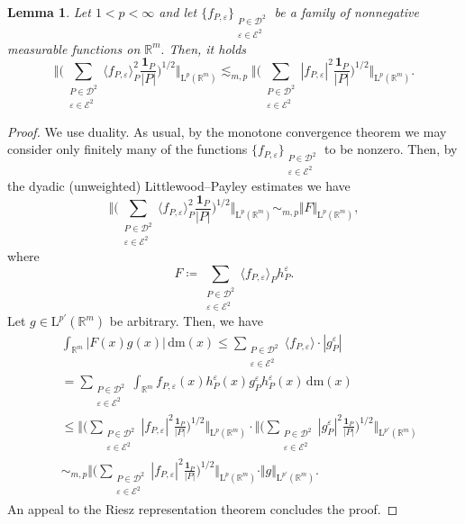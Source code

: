 \documentclass{article}
\newtheorem{lemma}[theorem]{Lemma}
\theoremstyle{definition}
\theoremstyle{remark}
\numberwithin{equation}{section}
\newcommand{\mathdm}{\,\mathrm{dm}}
\newcommand{\cD}{\mathcal{D}}
\newcommand{\cE}{\mathcal{E}}
\newcommand{\e}{\varepsilon}
\newcommand{\reals}{\mathbb{R}}
\newcommand{\Lp}[1]{\mathrm{L}^{#1}}
\newcommand{\1}{\mathbf{1}}
\begin{document}
    \begin{lemma}
        \label{lemma:technical_observation}
        Let $1<p<\infty$ and let $\{f_{P,\e}\}_{\substack{P\in\cD^2\\\e\in\cE^2}}$ be a family of nonnegative measurable functions on $\reals^m.$ Then, it holds
        \begin{equation*}
            \bigg\Vert\bigg(\sum_{\substack{P\in\cD^2\\\e\in\cE^2}}\langle f_{P,\e}\rangle_{P}^2\frac{\1_{P}}{|P|}\bigg)^{1/2}\bigg\Vert_{\Lp{p}(\reals^{m})}
            \lesssim_{m,p}\bigg\Vert\bigg(\sum_{\substack{P\in\cD^2\\\e\in\cE^2}} |f_{P,\e}|^2\frac{\1_{P}}{|P|}\bigg)^{1/2}\bigg\Vert_{\Lp{p}(\reals^{m})}.
        \end{equation*}
    \end{lemma}

    \begin{proof}
        We use duality. As usual, by the monotone convergence theorem we may consider only finitely many of the functions $\{f_{P,\e}\}_{\substack{P\in\cD^2\\\e\in\cE^2}}$ to be nonzero. Then, by the dyadic (unweighted) Littlewood--Payley estimates we have
        \begin{equation*}
            \bigg\Vert\bigg(\sum_{\substack{P\in\cD^2\\\e\in\cE^2}}\langle f_{P,\e}\rangle_{P}^2\frac{\1_{P}}{|P|}\bigg)^{1/2}\bigg\Vert_{\Lp{p}(\reals^{m})}\sim_{m,p}\Vert F\Vert_{\Lp{p}(\reals^m)},
        \end{equation*}
        where
        \begin{equation*}
            F\coloneq \sum_{\substack{P\in\cD^2\\\e\in\cE^2}}\langle f_{P,\e}\rangle_{P}h_{P}^{\e}.
        \end{equation*}
        Let $g\in \Lp{p'}(\reals^m)$ be arbitrary. Then, we have
        \begin{align*}
            &\int_{\reals^m}|F(x)g(x)|\mathdm(x)\leq\sum_{\substack{P\in\cD^2\\\e\in\cE^2}}\langle f_{P,\e}\rangle\cdot|g_{P}^{\e}|\\
            &=\sum_{\substack{P\in\cD^2\\\e\in\cE^2}}\int_{\reals^m}f_{P,\e}(x)h_{P}^{\e}(x)g_{P}^{\e}h_{P}^{\e}(x)\mathdm(x)\\
            &\leq\bigg\Vert\bigg(\sum_{\substack{P\in\cD^2\\\e\in\cE^2}}|f_{P,\e}|^2\frac{\1_{P}}{|P|}\bigg)^{1/2}\bigg\Vert_{\Lp{p}(\reals^m)}\cdot
            \bigg\Vert\bigg(\sum_{\substack{P\in\cD^2\\\e\in\cE^2}}|g_{P}^{\e}|^2\frac{\1_{P}}{|P|}\bigg)^{1/2}\bigg\Vert_{\Lp{p'}(\reals^m)}\\
            &\sim_{m,p}\bigg\Vert\bigg(\sum_{\substack{P\in\cD^2\\\e\in\cE^2}}|f_{P,\e}|^2\frac{\1_{P}}{|P|}\bigg)^{1/2}\bigg\Vert_{\Lp{p}(\reals^m)}\cdot\Vert g\Vert_{\Lp{p'}(\reals^m)}.
        \end{align*}
        An appeal to the Riesz representation theorem concludes the proof.
    \end{proof}
\end{document}
